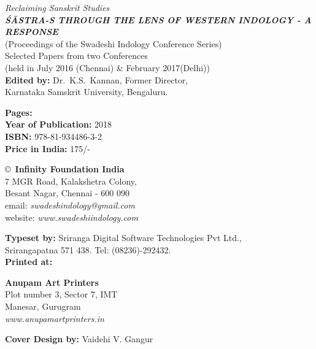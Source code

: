 \thispagestyle{empty}
\noindent
{\fontsize{9}{11}\selectfont\sl Reclaiming Sanskrit Studies}\\
{\sl\bfseries ŚĀSTRA-S THROUGH THE LENS OF WESTERN INDOLOGY - A RESPONSE}\\ 
(Proceedings of the Swadeshi Indology Conference Series)\\
Selected Papers from two Conferences\\ 
(held in July 2016 (Chennai) \& February 2017(Delhi))\\
{\bf Edited by:} Dr.\ K.S.\ Kannan, Former Director,\\ 
Karnataka Samskrit University, Bengaluru.
\vfill

\noindent
{\bf Pages:} \pageref{book:end}\\
{\bf Year of Publication:} 2018\\
{\bf ISBN:} 978-81-934486-3-2\\
{\bf Price in India:} 175/-
\vfill

\noindent
\copyright\ {\bf Infinity Foundation India}\\ 
7 MGR Road, Kalakshetra Colony,\\ 
Besant Nagar, Chennai - 600 090\\
email: {\sl swadeshindology@gmail.com}\\
website: {\sl www.swadeshiindology.com} 
\vfill

\noindent
{\bf Typeset by:} Sriranga Digital Software Technologies Pvt Ltd.,\\ 
Srirangapatna 571 438. Tel: (08236)-292432.\\

\noindent
{\bf Printed at:} 

\noindent
{\bf Anupam Art Printers}\\
Plot number 3, Sector 7, IMT\\
Manesar, Gurugram\\
{\sl www.anupamartprinters.in}
\noindent

\bigskip

{\bf Cover Design by:} Vaidehi V. Gangur
